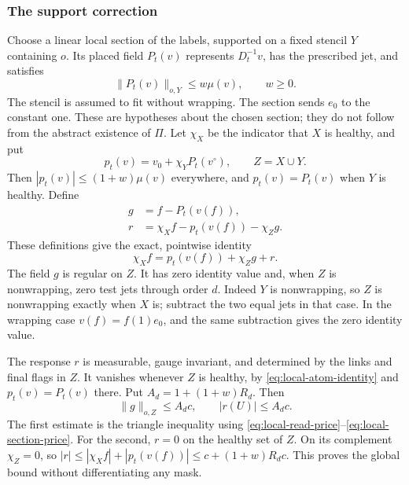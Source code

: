 \subsubsection{The support correction}
Choose a linear local section of the labels, supported on a fixed
stencil $Y$ containing $o$. Its placed field $P_t(v)$ represents
$D_t^{-1}v$, has the prescribed jet, and satisfies
\begin{equation}\label{eq:local-section-price}
              \|P_t(v)\|_{o,Y}\le w\mu(v),\qquad w\ge0.
\end{equation}
The stencil is assumed to fit without wrapping. The section sends
$e_0$ to the constant one. These are hypotheses about the chosen
section; they do not follow from the abstract existence of $\Pi$.
Let $\chi_X$ be the indicator that $X$ is healthy, and put
\[
       p_t(v)=v_0+\chi_Y P_t(v^\circ),\qquad Z=X\cup Y.
\]
Then $|p_t(v)|\le(1+w)\mu(v)$ everywhere, and
$p_t(v)=P_t(v)$ when $Y$ is healthy. Define
\begin{align}
       g&=f-P_t(v(f)),\\
       r&=\chi_X f-p_t(v(f))-\chi_Zg.
       \label{eq:local-rebate}
\end{align}
These definitions give the exact, pointwise identity
\begin{equation}\label{eq:local-atom-identity}
                  \chi_X f=p_t(v(f))+\chi_Zg+r.
\end{equation}
The field $g$ is regular on $Z$. It has zero identity value and,
when $Z$ is nonwrapping, zero test jets through order $d$.
Indeed $Y$ is nonwrapping, so $Z$ is nonwrapping exactly when $X$
is; subtract the two equal jets in that case. In the wrapping case
$v(f)=f(1)e_0$, and the same subtraction gives the zero identity value.

The response $r$ is measurable, gauge invariant, and determined by
the links and final flags in $Z$. It vanishes whenever $Z$ is healthy,
by \eqref{eq:local-atom-identity} and $p_t(v)=P_t(v)$ there.
Put $A_d=1+(1+w)R_d$. Then
\begin{equation}\label{eq:local-atom-cost}
             \|g\|_{o,Z}\le A_dc,\qquad |r(U)|\le A_dc.
\end{equation}
The first estimate is the triangle inequality using
\eqref{eq:local-read-price}--\eqref{eq:local-section-price}.
For the second, $r=0$ on the healthy set of $Z$. On its complement
$\chi_Z=0$, so
$|r|\le|\chi_X f|+|p_t(v(f))|\le c+(1+w)R_dc$.
This proves the global bound without differentiating any mask.

